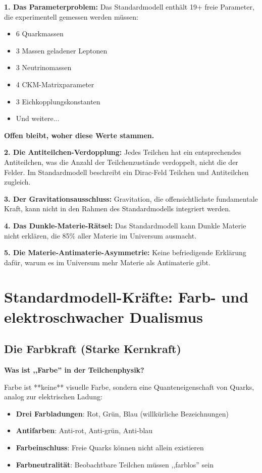 	\textbf{1. Das Parameterproblem:}
	Das Standardmodell enthält 19+ freie Parameter, die experimentell gemessen werden müssen:
	\begin{itemize}
		\item 6 Quarkmassen
		\item 3 Massen geladener Leptonen  
		\item 3 Neutrinomassen
		\item 4 CKM-Matrixparameter
		\item 3 Eichkopplungskonstanten
		\item Und weitere...
	\end{itemize}
	
	\textbf{Offen bleibt, woher diese Werte stammen.}
	
	\textbf{2. Die Antiteilchen-Verdopplung:}
	Jedes Teilchen hat ein entsprechendes Antiteilchen, was die Anzahl der Teilchenzustände verdoppelt, nicht die der Felder. Im Standardmodell beschreibt ein Dirac-Feld Teilchen und Antiteilchen zugleich.
	
	\textbf{3. Der Gravitationsausschluss:}
	Gravitation, die offensichtlichste fundamentale Kraft, kann nicht in den Rahmen des Standardmodells integriert werden.
	
	\textbf{4. Das Dunkle-Materie-Rätsel:}
	Das Standardmodell kann Dunkle Materie nicht erklären, die 85\% aller Materie im Universum ausmacht.
	
	\textbf{5. Die Materie-Antimaterie-Asymmetrie:}
	Keine befriedigende Erklärung dafür, warum es im Universum mehr Materie als Antimaterie gibt.
	
	\section{Standardmodell-Kräfte: Farb- und elektroschwacher Dualismus}
	
	\subsection{Die Farbkraft (Starke Kernkraft)}
	
	\textbf{Was ist ,,Farbe'' in der Teilchenphysik?}
	
	Farbe ist **keine** visuelle Farbe, sondern eine Quanteneigenschaft von Quarks, analog zur elektrischen Ladung:
	
	\begin{itemize}
		\item \textbf{Drei Farbladungen}: Rot, Grün, Blau (willkürliche Bezeichnungen)
		\item \textbf{Antifarben}: Anti-rot, Anti-grün, Anti-blau
		\item \textbf{Farbeinschluss}: Freie Quarks können nicht allein existieren
		\item \textbf{Farbneutralität}: Beobachtbare Teilchen müssen ,,farblos'' sein
	\end{itemize}
	
